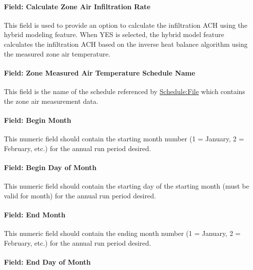 \paragraph{Field: Calculate Zone Air Infiltration Rate}\label{field-calculate-zone-air-fnfiltration-rate-hm}

This field is used to provide an option to calculate the infiltration ACH using the hybrid modeling feature. When YES is selected, the hybrid model feature calculates the infiltration ACH based on the inverse heat balance algorithm using the measured zone air temperature.

\paragraph{Field: Zone Measured Air Temperature Schedule Name}\label{field-zone-measured-air-temperature-schedule-name-hm}

This field is the name of the schedule referenced by \hyperref[schedulefile]{Schedule:File} which contains the zone air measurement data.

\paragraph{Field: Begin Month}\label{field-begin-month-hm}

This numeric field should contain the starting month number (1 = January, 2 = February, etc.) for the annual run period desired.

\paragraph{Field: Begin Day of Month}\label{field-begin-day-of-month-hm}

This numeric field should contain the starting day of the starting month (must be valid for month) for the annual run period desired.

\paragraph{Field: End Month}\label{field-end-month-hm}

This numeric field should contain the ending month number (1 = January, 2 = February, etc.) for the annual run period desired.

\paragraph{Field: End Day of Month}\label{field-end-day-of-month-hm}

